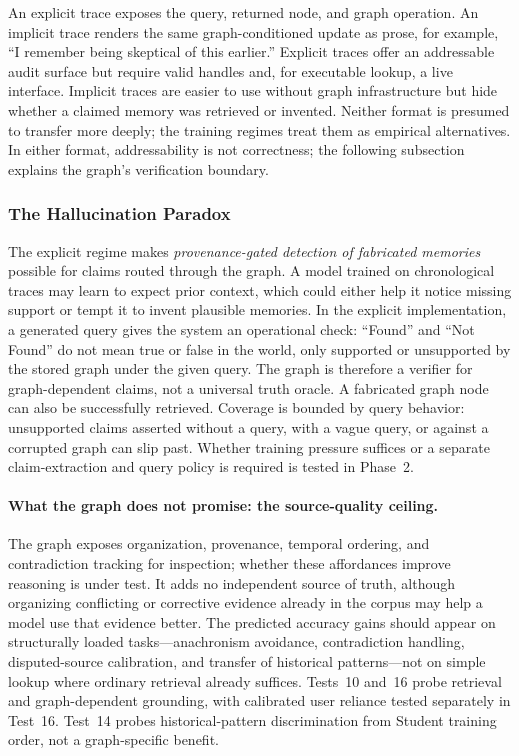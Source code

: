\documentclass[11pt]{article}
\begin{document}
An explicit trace exposes the query, returned node, and graph operation. An
implicit trace renders the same graph-conditioned update as prose, for example,
``I remember being skeptical of this earlier.'' Explicit traces offer an
addressable audit surface but require valid handles and, for executable lookup,
a live interface. Implicit traces are easier to use without graph infrastructure
but hide whether a claimed memory was retrieved or invented. Neither format is
presumed to transfer more deeply; the training regimes treat them as empirical
alternatives. In either format, addressability is not correctness; the following
subsection explains the graph's verification boundary.

\subsubsection{The Hallucination Paradox}\label{sec:hallucination}

The explicit regime makes \emph{provenance-gated detection of fabricated
memories} possible for claims routed through the graph. A model trained on
chronological traces may learn to expect prior context, which could either
help it notice missing support or tempt it to invent plausible memories. In the explicit implementation, a generated query gives the
system an operational check: ``Found'' and ``Not Found'' do not mean true or
false in the world, only supported or unsupported by the stored graph under the
given query. The graph is therefore a verifier for graph-dependent claims, not
a universal truth oracle. A fabricated graph node can also be successfully
retrieved. Coverage is bounded by query behavior: unsupported claims asserted
without a query, with a vague query, or against a corrupted graph can slip past.
Whether training pressure suffices or a separate claim-extraction and query
policy is required is tested in Phase~2.

\paragraph{What the graph does not promise: the source-quality ceiling.} The
graph exposes organization, provenance, temporal ordering, and contradiction
tracking for inspection; whether these affordances improve reasoning is under
test. It adds no independent source of truth, although organizing conflicting
or corrective evidence already in the corpus may help a model use that evidence
better. The predicted accuracy gains should appear on structurally loaded tasks---anachronism avoidance,
contradiction handling, disputed-source calibration, and transfer of historical
patterns---not on simple lookup where ordinary retrieval already suffices.
Tests~10 and~16 probe retrieval and graph-dependent grounding, with calibrated
user reliance tested separately in Test~16. Test~14 probes historical-pattern
discrimination from Student training order, not a graph-specific benefit.
\end{document}
